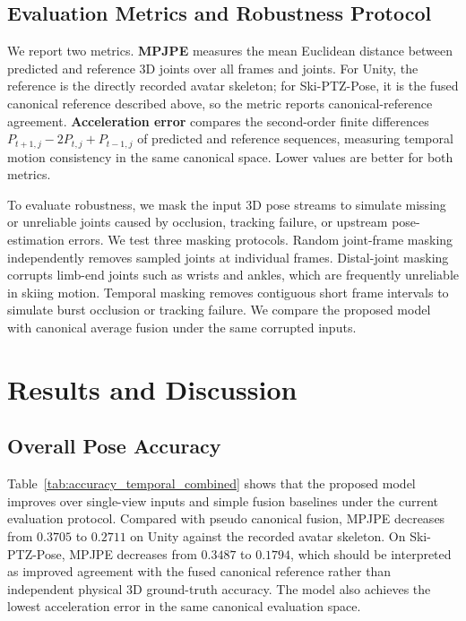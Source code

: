 \documentclass[sigconf,screen]{acmart}
\begin{document}
\subsection{Evaluation Metrics and Robustness Protocol}

We report two metrics. \textbf{MPJPE} measures the mean Euclidean distance between predicted and reference 3D joints over all frames and joints. For Unity, the reference is the directly recorded avatar skeleton; for Ski-PTZ-Pose, it is the fused canonical reference described above, so the metric reports canonical-reference agreement. \textbf{Acceleration error} compares the second-order finite differences \(P_{t+1,j}-2P_{t,j}+P_{t-1,j}\) of predicted and reference sequences, measuring temporal motion consistency in the same canonical space. Lower values are better for both metrics.

To evaluate robustness, we mask the input 3D pose streams to simulate missing or unreliable joints caused by occlusion, tracking failure, or upstream pose-estimation errors. We test three masking protocols. Random joint-frame masking independently removes sampled joints at individual frames. Distal-joint masking corrupts limb-end joints such as wrists and ankles, which are frequently unreliable in skiing motion. Temporal masking removes contiguous short frame intervals to simulate burst occlusion or tracking failure. We compare the proposed model with canonical average fusion under the same corrupted inputs.

\section{Results and Discussion}

\subsection{Overall Pose Accuracy}

Table~\ref{tab:accuracy_temporal_combined} shows that the proposed model improves over single-view inputs and simple fusion baselines under the current evaluation protocol. Compared with pseudo canonical fusion, MPJPE decreases from \(0.3705\) to \(0.2711\) on Unity against the recorded avatar skeleton. On Ski-PTZ-Pose, MPJPE decreases from \(0.3487\) to \(0.1794\), which should be interpreted as improved agreement with the fused canonical reference rather than independent physical 3D ground-truth accuracy. The model also achieves the lowest acceleration error in the same canonical evaluation space.
\end{document}
